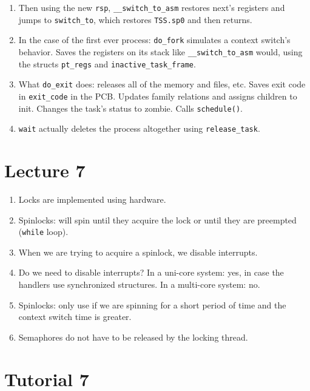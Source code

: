 \documentclass[12pt,a4paper]{article}
\begin{document}
\begin{enumerate}
  \item Then using the new \texttt{rsp}, \texttt{\_\_switch\_to\_asm} restores next's registers and jumps to \texttt{switch\_to}, which restores \texttt{TSS.sp0} and then returns.
  \item In the case of the first ever process: \texttt{do\_fork} simulates a context switch's behavior. Saves the registers on its stack like \texttt{\_\_switch\_to\_asm} would, using the structs \texttt{pt\_regs} and \texttt{inactive\_task\_frame}.
  \item What \texttt{do\_exit} does: releases all of the memory and files, etc. Saves exit code in \texttt{exit\_code} in the PCB. Updates family relations and assigns children to init. Changes the task's status to zombie. Calls \texttt{schedule()}.
  \item \texttt{wait} actually deletes the process altogether using \texttt{release\_task}.
\end{enumerate}

\section{Lecture 7}

\begin{enumerate}
  \item Locks are implemented using hardware.
  \item Spinlocks: will spin until they acquire the lock or until they are preempted (\texttt{while} loop).
  \item When we are trying to acquire a spinlock, we disable interrupts.
  \item Do we need to disable interrupts? In a uni-core system: yes, in case the handlers use synchronized structures. In a multi-core system: no.
  \item Spinlocks: only use if we are spinning for a short period of time and the context switch time is greater.
  \item Semaphores do not have to be released by the locking thread.
\end{enumerate}

\section{Tutorial 7}
\end{document}
